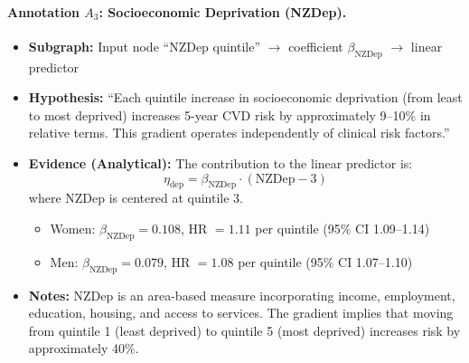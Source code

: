 \documentclass{article}
\begin{document}
\paragraph{Annotation $A_3$: Socioeconomic Deprivation (NZDep).}
\begin{itemize}
    \item \textbf{Subgraph:} Input node ``NZDep quintile'' $\rightarrow$ coefficient $\beta_{\text{NZDep}}$ $\rightarrow$ linear predictor
    \item \textbf{Hypothesis:} ``Each quintile increase in socioeconomic deprivation (from least to most deprived) increases 5-year CVD risk by approximately 9--10\% in relative terms. This gradient operates independently of clinical risk factors.''
    \item \textbf{Evidence (Analytical):} The contribution to the linear predictor is:
    \[
    \eta_{\text{dep}} = \beta_{\text{NZDep}} \cdot (\text{NZDep} - 3)
    \]
    where NZDep is centered at quintile 3.
    \begin{itemize}
        \item Women: $\beta_{\text{NZDep}} = 0.108$, HR $= 1.11$ per quintile (95\% CI 1.09--1.14)
        \item Men: $\beta_{\text{NZDep}} = 0.079$, HR $= 1.08$ per quintile (95\% CI 1.07--1.10)
    \end{itemize}
    \item \textbf{Notes:} NZDep is an area-based measure incorporating income, employment, education, housing, and access to services. The gradient implies that moving from quintile 1 (least deprived) to quintile 5 (most deprived) increases risk by approximately 40\%.
\end{itemize}
\end{document}
